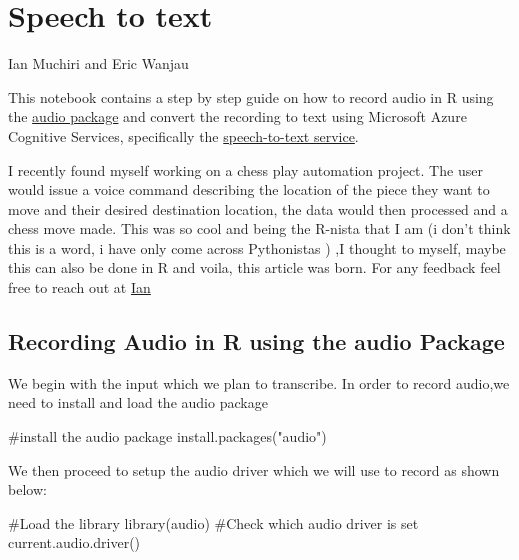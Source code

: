 \documentclass[
  letterpaper,
  DIV=11,
  numbers=noendperiod]{scrreprt}
\newenvironment{Shaded}{\begin{snugshade}}{\end{snugshade}}
\newcommand{\CommentTok}[1]{\textcolor[rgb]{0.37,0.37,0.37}{#1}}
\newcommand{\FunctionTok}[1]{\textcolor[rgb]{0.28,0.35,0.67}{#1}}
\newcommand{\NormalTok}[1]{\textcolor[rgb]{0.00,0.23,0.31}{#1}}
\newcommand{\StringTok}[1]{\textcolor[rgb]{0.13,0.47,0.30}{#1}}
\begin{document}

\hypertarget{speech-to-text}{%
\chapter{Speech to text}\label{speech-to-text}}

Ian Muchiri and Eric Wanjau

\hfill\break

This notebook contains a step by step guide on how to record audio in R
using the
\href{https://cran.r-project.org/web/packages/audio/audio.pdf}{audio
package} and convert the recording to text using Microsoft Azure
Cognitive Services, specifically the
\href{https://docs.microsoft.com/en-us/azure/cognitive-services/speech-service/rest-speech-to-text-short}{speech-to-text
service}.

I recently found myself working on a chess play automation project. The
user would issue a voice command describing the location of the piece
they want to move and their desired destination location, the data would
then processed and a chess move made. This was so cool and being the
R-nista that I am (i don't think this is a word, i have only come across
Pythonistas ) ,I thought to myself, maybe this can also be done in R and
voila, this article was born. For any feedback feel free to reach out at
\href{https://twitter.com/Entity_4004}{Ian}

\hypertarget{recording-audio-in-r-using-the-audio-package}{%
\section{Recording Audio in R using the audio
Package}\label{recording-audio-in-r-using-the-audio-package}}

We begin with the input which we plan to transcribe. In order to record
audio,we need to install and load the audio package

\begin{Shaded}
\begin{Highlighting}[]
\CommentTok{\#install the audio package}
\FunctionTok{install.packages}\NormalTok{(}\StringTok{"audio"}\NormalTok{)}
\end{Highlighting}
\end{Shaded}

We then proceed to setup the audio driver which we will use to record as
shown below:

\begin{Shaded}
\begin{Highlighting}[]
\CommentTok{\#Load the library}
\FunctionTok{library}\NormalTok{(audio)}
\CommentTok{\#Check which audio driver is set}
\FunctionTok{current.audio.driver}\NormalTok{()}
\end{Highlighting}
\end{Shaded}
\end{document}
